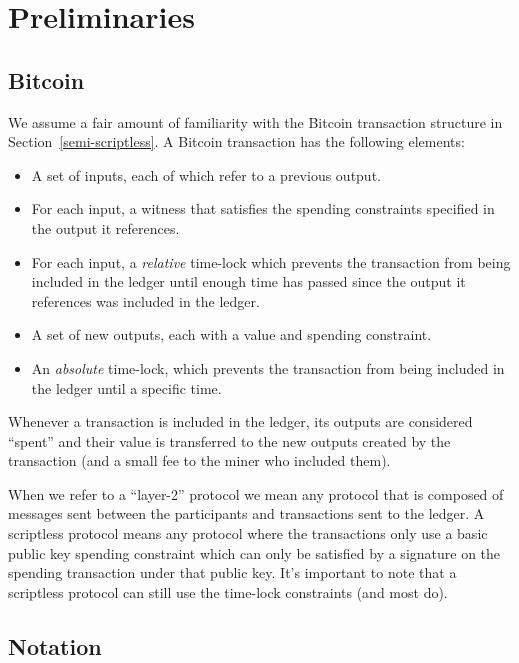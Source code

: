 \section{Preliminaries}

\subsection{Bitcoin}
We assume a fair amount of familiarity with the Bitcoin transaction structure in Section~\ref{semi-scriptless}. A Bitcoin transaction has the following elements:
\begin{itemize}
    \item A set of inputs, each of which refer to a previous output.
    \item For each input, a witness that satisfies the spending constraints specified in the output it references.
    \item For each input, a \emph{relative} time-lock which prevents the transaction from being included in the ledger until enough time has passed since the output it references was included in the ledger.
    \item A set of new outputs, each with a value and spending constraint.
    \item An \emph{absolute} time-lock, which prevents the transaction from being included in the ledger until a specific time.
\end{itemize}
Whenever a transaction is included in the ledger, its outputs are considered ``spent'' and their value is transferred to the new outputs created by the transaction (and a small fee to the miner who included them).

When we refer to a ``layer-2'' protocol we mean any protocol that is composed of messages sent between the participants and transactions sent to the ledger. A scriptless protocol means any protocol where the transactions only use a basic public key spending constraint which can only be satisfied by a signature on the spending transaction under that public key. It's important to note that a scriptless protocol can still use the time-lock constraints (and most do).

\subsection{Notation}

